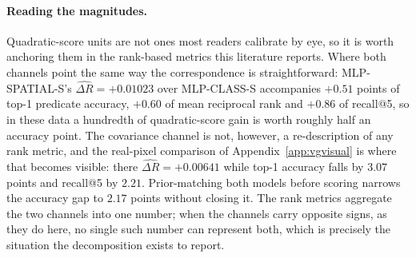 \paragraph{Reading the magnitudes.} Quadratic-score units are not ones most readers
calibrate by eye, so it is worth anchoring them in the rank-based metrics this
literature reports. Where both channels point the same way the correspondence is
straightforward: MLP-SPATIAL-S's $\widehat{\Delta R}=+0.01023$ over MLP-CLASS-S
accompanies $+0.51$ points of top-1 predicate accuracy, $+0.60$ of mean reciprocal rank
and $+0.86$ of recall@5, so in these data a hundredth of quadratic-score gain is worth
roughly half an accuracy point. The covariance channel is not, however, a re-description
of any rank metric, and the real-pixel comparison of Appendix~\ref{app:vgvisual} is
where that becomes visible: there $\widehat{\Delta R}=+0.00641$ while top-1 accuracy
falls by $3.07$ points and recall@5 by $2.21$. Prior-matching both models before scoring
narrows the accuracy gap to $2.17$ points without closing it. The rank metrics aggregate
the two channels into one number; when the channels carry opposite signs, as they do
here, no single such number can represent both, which is precisely the situation the
decomposition exists to report.

\begin{table}[t]
\centering
\caption{WAGER decomposition on 227,337 identified VG150 PredCls relations. Gains use
the quadratic score. CI is image-cluster robust; $p$ is the 499-shift relation-level
randomization diagnostic (granularity floor $.002$). ``--'' denotes an undefined share
because total gain is negative. The MLP-CLASS row's zero-width interval is exact by
construction, not a sampling statement: a gain vector constant within every cell makes
the antisymmetric kernel identically zero (Theorem~\ref{thm:population}), so no
variability exists for the interval to measure.}
\label{tab:wager-results}
\end{table}

